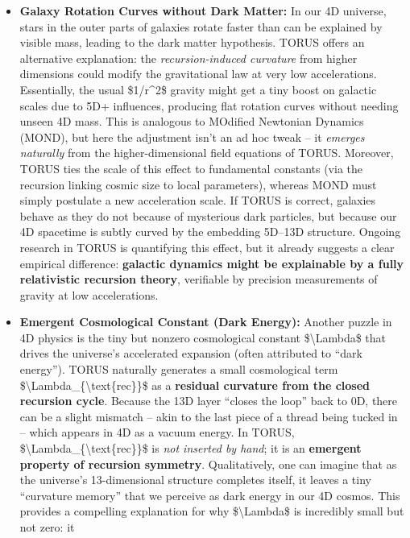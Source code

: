 \begin{itemize}
\item
  \textbf{Galaxy Rotation Curves without Dark Matter:} In our 4D
  universe, stars in the outer parts of galaxies rotate faster than can
  be explained by visible mass, leading to the dark matter hypothesis.
  TORUS offers an alternative explanation: the \emph{recursion-induced
  curvature} from higher dimensions could modify the gravitational law
  at very low accelerations​. Essentially, the usual \$1/r\^{}2\$
  gravity might get a tiny boost on galactic scales due to 5D+
  influences, producing flat rotation curves without needing unseen 4D
  mass. This is analogous to MOdified Newtonian Dynamics (MOND), but
  here the adjustment isn't an ad hoc tweak -- it \emph{emerges
  naturally} from the higher-dimensional field equations of TORUS​.
  Moreover, TORUS ties the scale of this effect to fundamental constants
  (via the recursion linking cosmic size to local parameters), whereas
  MOND must simply postulate a new acceleration scale. If TORUS is
  correct, galaxies behave as they do not because of mysterious dark
  particles, but because our 4D spacetime is subtly curved by the
  embedding 5D--13D structure. Ongoing research in TORUS is quantifying
  this effect, but it already suggests a clear empirical difference:
  \textbf{galactic dynamics might be explainable by a fully relativistic
  recursion theory}, verifiable by precision measurements of gravity at
  low accelerations.
\item
  \textbf{Emergent Cosmological Constant (Dark Energy):} Another puzzle
  in 4D physics is the tiny but nonzero cosmological constant
  \$\textbackslash{}Lambda\$ that drives the universe's accelerated
  expansion (often attributed to ``dark energy''). TORUS naturally
  generates a small cosmological term
  \$\textbackslash{}Lambda\_\{\textbackslash{}text\{rec\}\}\$ as a
  \textbf{residual curvature from the closed recursion cycle}​. Because
  the 13D layer ``closes the loop'' back to 0D, there can be a slight
  mismatch -- akin to the last piece of a thread being tucked in --
  which appears in 4D as a vacuum energy. In TORUS,
  \$\textbackslash{}Lambda\_\{\textbackslash{}text\{rec\}\}\$ is
  \emph{not inserted by hand}; it is an \textbf{emergent property of
  recursion symmetry}​. Qualitatively, one can imagine that as the
  universe's 13-dimensional structure completes itself, it leaves a tiny
  ``curvature memory'' that we perceive as dark energy in our 4D cosmos.
  This provides a compelling explanation for why
  \$\textbackslash{}Lambda\$ is incredibly small but not zero: it

\end{itemize}
